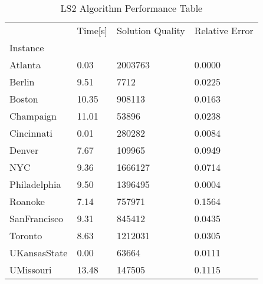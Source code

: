 \begin{table}
\caption{ LS2 Algorithm Performance Table }
\begin{tabular}{llll}
\toprule
{} & Time[s] & Solution Quality & Relative Error \\
Instance     &         &                  &                \\
\midrule
Atlanta      &    0.03 &          2003763 &         0.0000 \\
Berlin       &    9.51 &             7712 &         0.0225 \\
Boston       &   10.35 &           908113 &         0.0163 \\
Champaign    &   11.01 &            53896 &         0.0238 \\
Cincinnati   &    0.01 &           280282 &         0.0084 \\
Denver       &    7.67 &           109965 &         0.0949 \\
NYC          &    9.36 &          1666127 &         0.0714 \\
Philadelphia &    9.50 &          1396495 &         0.0004 \\
Roanoke      &    7.14 &           757971 &         0.1564 \\
SanFrancisco &    9.31 &           845412 &         0.0435 \\
Toronto      &    8.63 &          1212031 &         0.0305 \\
UKansasState &    0.00 &            63664 &         0.0111 \\
UMissouri    &   13.48 &           147505 &         0.1115 \\
\bottomrule
\end{tabular}
\end{table}
